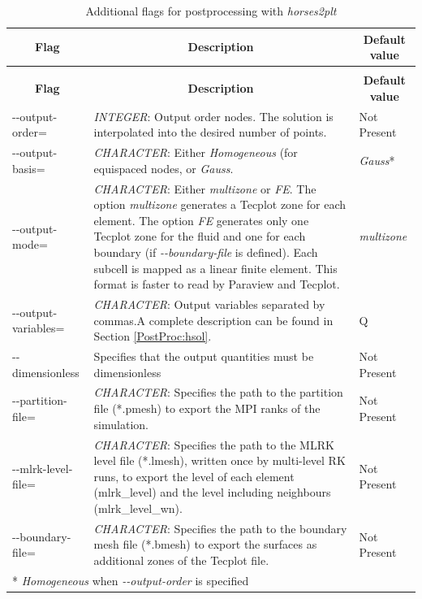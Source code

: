 \documentclass[a4paper,10pt]{report}
\begin{document}
\begin{longtable}{|p{4cm}|p{10cm}|p{2.2cm}|}
\caption{Flags for \textit{horses2plt}.} \label{tab:Postprocessing} \\
\hline
\multicolumn{1}{|c|}{\textbf{Flag}} & \multicolumn{1}{c|}{\textbf{Description}} & \multicolumn{1}{c|}{\textbf{Default value}} \\ \hline
\endfirsthead

\caption{Additional flags for postprocessing with \textit{horses2plt}} \\
\hline
\multicolumn{1}{|c|}{\textbf{Flag}} & \multicolumn{1}{c|}{\textbf{Description}} & \multicolumn{1}{c|}{\textbf{Default value}} \\ \hline
\endhead

-{}-output-order= 	& 
			\textit{INTEGER}: Output order nodes. The solution is interpolated into the desired number of points. & 
							Not Present \\ \hline
							
-{}-output-basis= 	& 
			\textit{CHARACTER}: Either \textit{Homogeneous} (for equispaced nodes, or \textit{Gauss}.  & 
							\textit{Gauss}* \\ \hline
							
-{}-output-mode= 	& 
			\textit{CHARACTER}: Either \textit{multizone} or \textit{FE}. The option \textit{multizone} generates a Tecplot zone for each element. The option \textit{FE} generates only one Tecplot zone for the fluid and one for each boundary (if \textit{-{}-boundary-file} is defined).
			Each subcell is mapped as a linear finite element. This format is faster to read by Paraview and Tecplot.  & 
							\textit{multizone} \\ \hline
							
-{}-output-variables= 	& 
			\textit{CHARACTER}: Output variables separated by commas.A complete description can be found in Section \ref{PostProc:hsol}. & 
							Q \\ \hline

-{}-dimensionless 	& 
			Specifies that the output quantities must be dimensionless & 
							Not Present  \\ \hline
							
-{}-partition-file= 	& 
			\textit{CHARACTER}: Specifies the path to the partition file (*.pmesh) to export the MPI ranks of the simulation. & 
							Not Present  \\ \hline

-{}-mlrk-level-file= 	&
			\textit{CHARACTER}: Specifies the path to the MLRK level file (*.lmesh), written once by multi-level RK runs, to export the level of each element (mlrk\_level) and the level including neighbours (mlrk\_level\_wn). &
							Not Present  \\ \hline
							
-{}-boundary-file= 	& 
			\textit{CHARACTER}: Specifies the path to the boundary mesh file (*.bmesh) to export the surfaces as additional zones of the Tecplot file. & 
							Not Present  \\ \hline
\multicolumn{3}{p{16.4cm}}{*  \textit{Homogeneous} when \textit{-{}-output-order} is specified} \\

\end{longtable}
\end{document}
